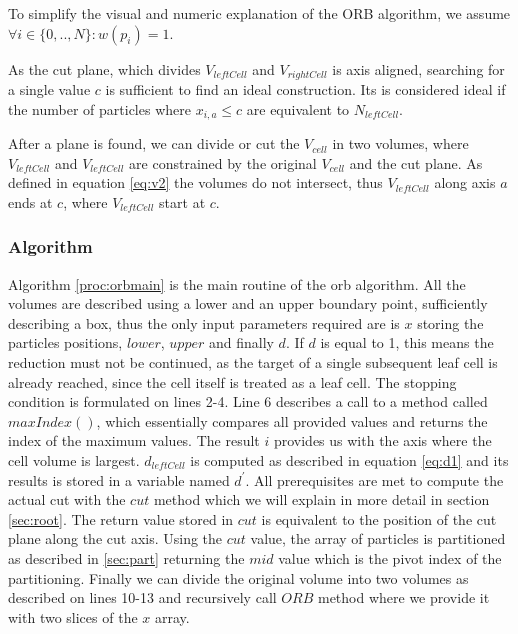\documentclass[]{article}
\begin{document}
To simplify the visual and numeric explanation of the ORB algorithm, we assume $\forall i \in \{0,..,N\} : w(p_i) = 1$.

As the cut plane, which divides $V_{leftCell}$ and $V_{rightCell}$ is axis aligned, searching for a single value $c$ is sufficient to find an ideal construction. Its is considered ideal if the number of particles where $x_{i,a} \leq c$ are equivalent to $N_{leftCell}$. 

After a plane is found, we can divide or cut the $V_{cell}$ in two volumes, where $V_{leftCell}$ and $V_{leftCell}$ are constrained by the original $V_{cell}$ and the cut plane. As defined in equation \ref{eq:v2} the volumes do not intersect, thus $V_{leftCell}$ along axis $a$ ends at $c$, where $V_{leftCell}$ start at $c$.
    
  
\subsubsection{Algorithm}

Algorithm \ref{proc:orbmain} is the main routine of the orb algorithm. All the volumes are described using a lower and an upper boundary point, sufficiently describing a box, thus the only input parameters required are is $x$ storing the particles positions, $lower$, $upper$ and finally $d$.
If $d$ is equal to 1, this means the reduction must not be continued, as the target of a single subsequent leaf cell is already reached, since the cell itself is treated as a leaf cell. The stopping condition is formulated on lines 2-4. 
Line 6 describes a call to a method called $maxIndex()$, which essentially compares all provided values and returns the index of the maximum values. The result $i$ provides us with the axis where the cell volume is largest. 
$d_{leftCell}$ is computed as described in equation \ref{eq:d1} and its results is stored in a variable named $d^\prime$. All prerequisites are met to compute the actual cut with the $cut$ method which we will explain in more detail in section \ref{sec:root}. The return value stored in $cut$ is equivalent to the position of the cut plane along the cut axis. Using the $cut$ value, the array of particles is partitioned as described in \ref{sec:part} returning the $mid$ value which is the pivot index of the partitioning.
Finally we can divide the original volume into two volumes as described on lines 10-13 and recursively call $ORB$ method where we provide it with two slices of the $x$ array.
\end{document}
